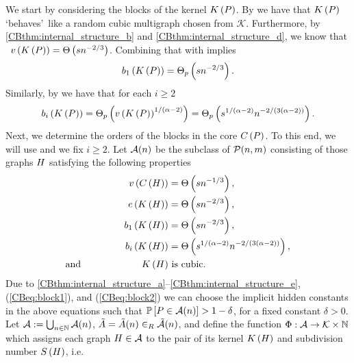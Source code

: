 We start by considering the blocks of the kernel $K\left(P\right)$. By  we have that $K\left(P\right)$ \lq behaves\rq\ like a random cubic multigraph chosen from $\mathcal{K}$. Furthermore, by \ref{CBthm:internal_structure_b} and \ref{CBthm:internal_structure_d}, we know that \whp\ $v\left({K\left(P\right)}\right)=\Theta\left(sn^{-2/3}\right)$. Combining that with  implies 
\begin{align}\label{CBeq:block1}
b_{1}\left(K\left(P\right)\right)=\Theta_p\left(sn^{-2/3}\right).
\end{align}
Similarly, by  we have that for each $i\geq 2$
\begin{align}\label{CBeq:block2}
b_{i}\left(K\left(P\right)\right)=\Theta_p\left(v\left({K\left(P\right)}\right)^{1/\left(\alpha-2\right)}\right)=\Theta_p\left(s^{1/\left(\alpha-2\right)}n^{-2/\left(3(\alpha-2)\right)}\right).
\end{align}
Next, we determine the orders of the blocks in the core $C\left(P\right)$. To this end, we will use  and we fix $i\geq 2$. Let $\mathcal{A}(n)$ be the subclass of $\mathcal{P}(n,m)$ consisting of those graphs $H$ satisfying the following properties
\begin{align*}
v\left({C\left(H\right)}\right)&=\Theta \left(sn^{-1/3}\right),\\
e\left({K\left(H\right)}\right)&=\Theta \left(sn^{-2/3}\right),\\
b_{1}\left(K\left(H\right)\right)&=\Theta\left(sn^{-2/3}\right),\\
b_{i}\left(K\left(H\right)\right)&=\Theta\left(s^{1/(\alpha-2)}n^{-2/\left(3(\alpha-2)\right)}\right),
\\
\text{and}~~~~~~~~~~~~~~~~~~~K\left(H\right)&\text{ is cubic}.
\end{align*} 
Due to \ref{CBthm:internal_structure_a}--\ref{CBthm:internal_structure_e}, (\ref{CBeq:block1}), and (\ref{CBeq:block2}) we can choose the implicit hidden constants in the above equations such that $\mathbb{P}\left[P \in \mathcal{A}(n)\right]>1-\delta$, for a fixed constant $\delta>0$. Let $\mathcal{A}:=\bigcup_{n\in\mathbb{N}} \mathcal{A}(n)$, $\tilde{A}=\tilde{A}(n)\in_R \tilde{\mathcal{A}}(n)$, and define the function $\Phi:\mathcal{A} \to \mathcal{K}\times \mathbb{N}$ which assigns each graph $H \in \mathcal{A}$ to the pair of its kernel $K\left(H\right)$ and subdivision number $S\left(H\right)$, i.e. 
